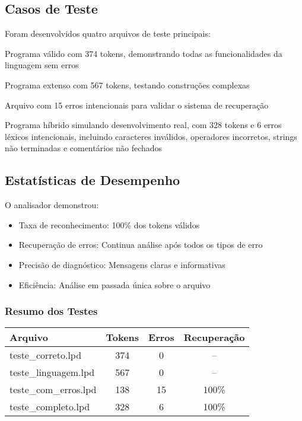 \documentclass[12pt]{article}
\begin{document}
\subsection{Casos de Teste}
Foram desenvolvidos quatro arquivos de teste principais:

\begin{description}[leftmargin=!,labelwidth=3.5cm]
    \item[\texttt{teste\_correto.lpd}] Programa válido com 374 tokens, demonstrando todas as funcionalidades da linguagem sem erros
    \item[\texttt{teste\_linguagem.lpd}] Programa extenso com 567 tokens, testando construções complexas
    \item[\texttt{teste\_com\_erros.lpd}] Arquivo com 15 erros intencionais para validar o sistema de recuperação
    \item[\texttt{teste\_completo.lpd}] Programa híbrido simulando desenvolvimento real, com 328 tokens e 6 erros léxicos intencionais, incluindo caracteres inválidos, operadores incorretos, strings não terminadas e comentários não fechados
\end{description}

\subsection{Estatísticas de Desempenho}
O analisador demonstrou:
\begin{itemize}[noitemsep]
    \item Taxa de reconhecimento: 100\% dos tokens válidos
    \item Recuperação de erros: Continua análise após todos os tipos de erro
    \item Precisão de diagnóstico: Mensagens claras e informativas
    \item Eficiência: Análise em passada única sobre o arquivo
\end{itemize}

\subsubsection{Resumo dos Testes}
\begin{center}
\begin{tabular}{|l|c|c|c|}
\hline
\textbf{Arquivo} & \textbf{Tokens} & \textbf{Erros} & \textbf{Recuperação} \\
\hline
teste\_correto.lpd & 374 & 0 & -- \\
teste\_linguagem.lpd & 567 & 0 & -- \\
teste\_com\_erros.lpd & 138 & 15 & 100\% \\
teste\_completo.lpd & 328 & 6 & 100\% \\
\hline
\end{tabular}
\end{center}
\end{document}
